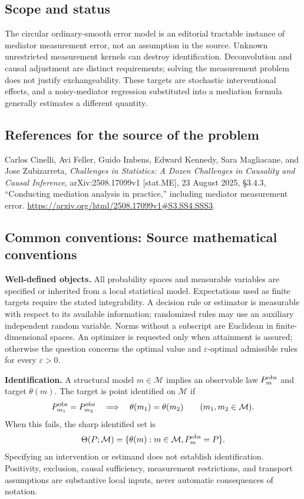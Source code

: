 \documentclass[11pt,a4paper]{article}
\begin{document}
\subsection*{Scope and status}
The circular ordinary-smooth error model is an editorial tractable instance of mediator measurement error, not an assumption in the source. Unknown unrestricted measurement kernels can destroy identification. Deconvolution and causal adjustment are distinct requirements; solving the measurement problem does not justify exchangeability. These targets are stochastic interventional effects, and a noisy-mediator regression substituted into a mediation formula generally estimates a different quantity.
\subsection*{References for the source of the problem}
Carlos Cinelli, Avi Feller, Guido Imbens, Edward Kennedy, Sara Magliacane, and Jose Zubizarreta, \emph{Challenges in Statistics: A Dozen Challenges in Causality and Causal Inference}, arXiv:2508.17099v1 [stat.ME], 23 August 2025, \S3.4.3, ``Conducting mediation analysis in practice,'' including mediator measurement error. \url{https://arxiv.org/html/2508.17099v1#S3.SS4.SSS3}.

\subsection*{Common conventions: Source mathematical conventions}

\textbf{Well-defined objects.}
All probability spaces and measurable variables are specified or inherited
from a local statistical model. Expectations used as finite targets require
the stated integrability. A decision rule or estimator is measurable with
respect to its available information; randomized rules may use an auxiliary
independent random variable. Norms without a subscript are Euclidean in
finite-dimensional spaces. An optimizer is requested only when attainment
is assured; otherwise the question concerns the optimal value and
$\varepsilon$-optimal admissible rules for every $\varepsilon>0$.

\textbf{Identification.}
A structural model $m\in\mathcal M$ implies an observable law
$P_m^{\rm obs}$ and target $\theta(m)$. The target is point identified on
$\mathcal M$ if
\[
 P_{m_1}^{\rm obs}=P_{m_2}^{\rm obs}
 \quad\Longrightarrow\quad\theta(m_1)=\theta(m_2)
 \qquad(m_1,m_2\in\mathcal M).
\]
When this fails, the sharp identified set is
\[
 \Theta(P;\mathcal M)=\{\theta(m):m\in\mathcal M,
                                  P_m^{\rm obs}=P\}.
\]
Specifying an intervention or estimand does not establish identification.
Positivity, exclusion, causal sufficiency, measurement restrictions, and
transport assumptions are substantive local inputs, never automatic
consequences of notation.
\end{document}
